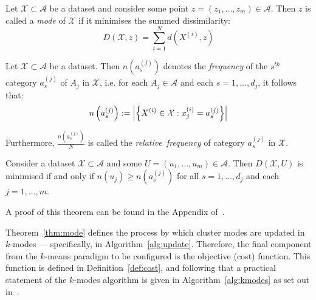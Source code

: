 \begin{definition}\label{def:mode}
    Let \(\mathcal{X} \subset \mathcal{A}\) be a dataset and consider some point
    \(z = \left(z_1, \ldots, z_m\right) \in \mathcal{A}\). Then \(z\) is called
    a \emph{mode} of \(\mathcal{X}\) if it minimises the summed dissimilarity:
    \begin{equation}\label{eq:summed-dissim}
        D\left(\mathcal{X}, z\right) = \sum_{i=1}^{N} d\left(X^{(i)}, z\right)
    \end{equation}
\end{definition}

\begin{definition}\label{def:rel-freq}
    Let \(\mathcal{X} \subset \mathcal{A}\) be a dataset. Then
    \(n\left(a_s^{(j)}\right)\) denotes the \emph{frequency} of the \(s^{th}\)
    category \(a_s^{(j)}\) of \(A_j\) in \(\mathcal{X}\), i.e. for each \(A_j
    \in \mathcal{A}\) and each \(s = 1, \ldots, d_j\), it follows that:
    \begin{equation}
        n\left(a_s^{(j)}\right) := \abs*{%
            {\left\{X^{(i)} \in \mathcal{X}: x_j^{(i)} = a_s^{(j)}\right\}}
        }
    \end{equation}

    Furthermore, \(\frac{n\left(a_s^{(j)}\right)}{N}\) is called the
    \emph{relative~frequency} of category \(a_s^{(j)}\) in \(\mathcal{X}\).
\end{definition}

\begin{theorem}\label{thm:mode}
    Consider a dataset \(\mathcal{X} \subset \mathcal{A}\) and some \(U = (u_1,
    \ldots, u_m) \in \mathcal{A}\). Then \(D(\mathcal{X}, U)\) is minimised if
    and only if \(n\left(u_j\right) \geq n\left(a_s^{(j)}\right)\) for all
    \(s=1, \ldots, d_j\) and each \(j = 1, \ldots, m\).

    A proof of this theorem can be found in the Appendix of~\cite{Huang1998}.
\end{theorem}

Theorem~\ref{thm:mode} defines the process by which cluster modes are updated in
\(k\)-modes --- specifically, in Algorithm~\ref{alg:update}. Therefore, the
final component from the \(k\)-means paradigm to be configured is the objective
(cost) function. This function is defined in Definition~\ref{def:cost}, and
following that a practical statement of the \(k\)-modes algorithm is given in
Algorithm~\ref{alg:kmodes} as set out in~\cite{Huang1998}.

